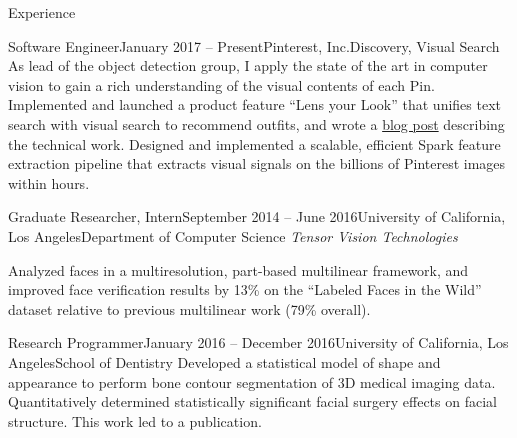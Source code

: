 \documentclass{resume}
\begin{document}
\begin{component}{Experience}
  \vspace{0.25em}
  \begin{position}{Software Engineer}{January 2017 -- Present}{Pinterest, Inc.}{Discovery, Visual Search}
    {As lead of the object detection group, I apply the state of the art in computer vision to gain a rich understanding of the visual contents of each Pin. Implemented and launched a product feature ``Lens your Look'' that unifies text search with visual search to recommend outfits, and wrote a \href{https://medium.com/@Pinterest_Engineering/building-lens-your-look-unifying-text-and-camera-search-1b2f3ef4e393}{blog post} describing the technical work.
      Designed and implemented a scalable, efficient Spark feature extraction pipeline that extracts visual signals on the billions of Pinterest images within hours. }
  \end{position}
  
	\begin{position}{Graduate Researcher, Intern}{September 2014 -- June 2016}{University of California, Los Angeles}{Department of Computer Science}
	\emph{Tensor Vision Technologies}

    {Analyzed faces in a multiresolution, part-based multilinear framework, and improved face verification results by 13\% on the ``Labeled Faces in the Wild'' dataset relative to previous multilinear work (79\% overall).
}
	\end{position}

\vspace{-0.25em}

    \begin{position}{Research Programmer}{January 2016 -- December 2016}{University of California, Los Angeles}{School of Dentistry}
{
Developed a statistical model of shape and appearance to perform bone contour segmentation of 3D medical imaging data.
\\
Quantitatively determined statistically significant facial surgery effects on facial structure.
This work led to a publication.
}
      \end{position}


\end{component}
\end{document}

